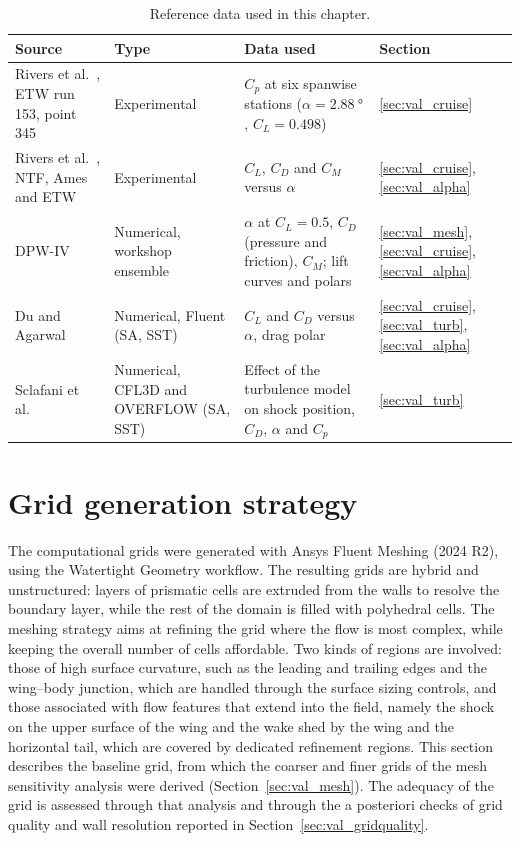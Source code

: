 \begin{table}[htbp]
  \centering
  \caption{Reference data used in this chapter.}
  \label{tab:val_refdata}
  \small
  \begin{tabular}{>{\raggedright\arraybackslash}p{3.2cm}>{\raggedright\arraybackslash}p{2.5cm}>{\raggedright\arraybackslash}p{4.0cm}>{\raggedright\arraybackslash}p{2.0cm}}
    \hline
    Source & Type & Data used & Section \\
    \hline
    Rivers et al.~\cite{rivers2015}, ETW run 153, point 345 & Experimental & $C_p$ at six spanwise stations ($\alpha = \SI{2.88}{\degree}$, $C_L = 0.498$) & \ref{sec:val_cruise} \\[2pt]
    Rivers et al.~\cite{rivers2015}, NTF, Ames and ETW & Experimental & $C_L$, $C_D$ and $C_M$ versus $\alpha$ & \ref{sec:val_cruise}, \ref{sec:val_alpha} \\[2pt]
    DPW-IV~\cite{vassberg2010,morrison2010} & Numerical, workshop ensemble & $\alpha$ at $C_L = 0.5$, $C_D$ (pressure and friction), $C_M$; lift curves and polars & \ref{sec:val_mesh}, \ref{sec:val_cruise}, \ref{sec:val_alpha} \\[2pt]
    Du and Agarwal~\cite{du2017} & Numerical, Fluent (SA, SST) & $C_L$ and $C_D$ versus $\alpha$, drag polar & \ref{sec:val_cruise}, \ref{sec:val_turb}, \ref{sec:val_alpha} \\[2pt]
    Sclafani et al.~\cite{sclafani2010} & Numerical, CFL3D and OVERFLOW (SA, SST) & Effect of the turbulence model on shock position, $C_D$, $\alpha$ and $C_p$ & \ref{sec:val_turb} \\
    \hline
  \end{tabular}
\end{table}

\section{Grid generation strategy}
\label{sec:val_grid}

The computational grids were generated with Ansys Fluent Meshing (2024 R2), using the Watertight Geometry workflow. The resulting grids are hybrid and unstructured: layers of prismatic cells are extruded from the walls to resolve the boundary layer, while the rest of the domain is filled with polyhedral cells. The meshing strategy aims at refining the grid where the flow is most complex, while keeping the overall number of cells affordable. Two kinds of regions are involved: those of high surface curvature, such as the leading and trailing edges and the wing--body junction, which are handled through the surface sizing controls, and those associated with flow features that extend into the field, namely the shock on the upper surface of the wing and the wake shed by the wing and the horizontal tail, which are covered by dedicated refinement regions. This section describes the baseline grid, from which the coarser and finer grids of the mesh sensitivity analysis were derived (Section~\ref{sec:val_mesh}). The adequacy of the grid is assessed through that analysis and through the a posteriori checks of grid quality and wall resolution reported in Section~\ref{sec:val_gridquality}.

